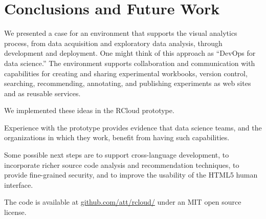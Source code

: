 \section{Conclusions and Future Work}

We presented a case for an environment that supports the visual
analytics process, from data acquisition and exploratory
data analysis, through development and deployment. One might
think of this approach as ``DevOps for data science.''
The environment supports collaboration and communication
with capabilities for creating and sharing experimental workbooks,
version control, searching, recommending, annotating, and publishing
experiments as web sites and as reusable services.

We implemented these ideas in the RCloud prototype.

Experience with the prototype provides evidence that data
science teams, and the organizations in which they work,
benefit from having such capabilities.

Some possible next steps are to support cross-language development,
to incorporate richer source code analysis and recommendation
techniques, to provide fine-grained security, and to improve
the usability of the HTML5 human interface.

The code is available 
at \url{github.com/att/rcloud/}
under an MIT open source license.
